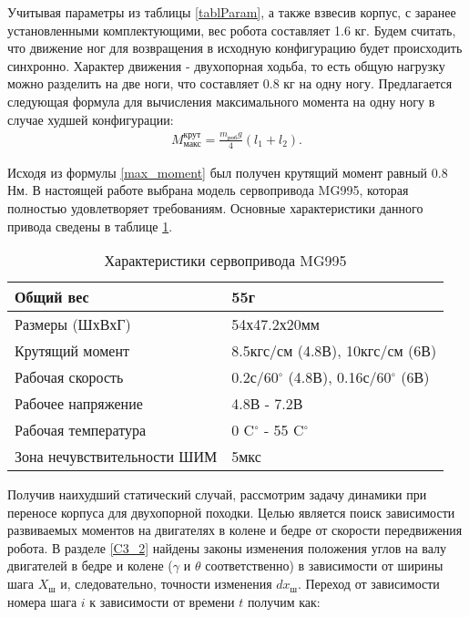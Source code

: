 Учитывая параметры из таблицы \ref{tablParam}, а также взвесив корпус, с заранее установленными комплектующими, вес робота составляет 1.6 кг. Будем считать, что движение ног для возвращения в исходную конфигурацию будет происходить синхронно. Характер движения - двухопорная ходьба, то есть общую нагрузку можно разделить на две ноги, что составляет 0.8 кг на одну ногу. Предлагается следующая формула для вычисления максимального момента на одну ногу в случае худшей конфигурации:
 \begin{equation}
	\begin{array}{l}
		M^{\text{крут}}_{\text{макс}} = \displaystyle\frac{m_{\text{роб}}g}{4}(l_{1}+l_{2}).
	\end{array}
	\label{max_moment}
\end{equation}

Исходя из формулы \ref{max_moment} был получен крутящий момент равный 0.8 Нм. В настоящей работе выбрана модель сервопривода MG995, которая полностью удовлетворяет требованиям. Основные характеристики данного привода сведены в таблице \ref{servoParam}.


\begin{table}[h]
	\begin{center}
		\caption{Характеристики сервопривода MG995}
		\label{servoParam}
		\begin{tabular}{| l | l |}
			\hline
			Общий вес   &    55г \\ \hline
			Размеры (ШхВхГ) & 54х47.2х20мм\\ \hline
			Крутящий момент & 8.5кгс/см (4.8В), 10кгс/см (6В) \\ \hline
			Рабочая скорость & 0.2с/60$^{\circ}$ (4.8В), 0.16с/60$^{\circ}$ (6В) \\ \hline
			Рабочее напряжение & 4.8В - 7.2В \\ \hline
			Рабочая температура & 0 C$^{\circ}$  - 55 C$^{\circ}$ \\ \hline
			Зона нечувствительности ШИМ & 5мкс \\ \hline
		\end{tabular}
	\end{center}
\end{table} 


Получив наихудший статический случай, рассмотрим задачу динамики при переносе корпуса для двухопорной походки. Целью является поиск зависимости развиваемых моментов на двигателях в колене и бедре от скорости передвижения робота. В разделе \ref{C3_2} найдены законы изменения положения углов на валу двигателей в бедре и колене ($\gamma$ и $\theta$ соответственно) в зависимости от ширины шага  $X_{\text{ш}}$ и, \space следовательно, точности изменения $dx_{\text{ш}}$. Переход от зависимости номера шага $i$ к зависимости от времени $t$ получим как:

